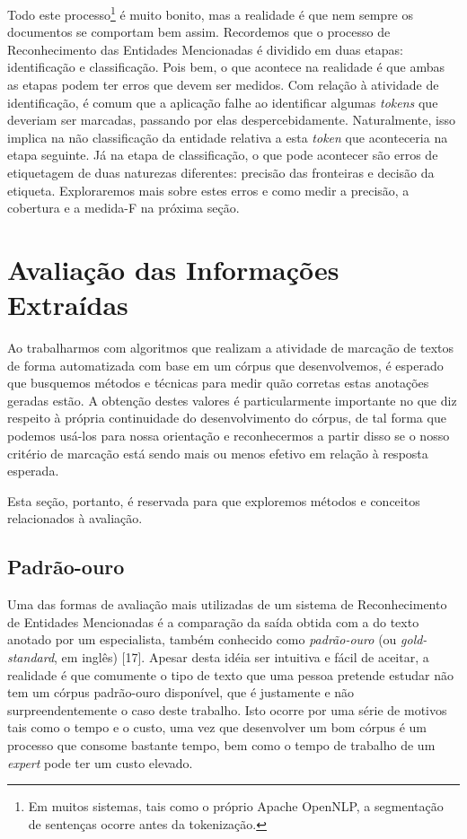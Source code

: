\documentclass[11pt]{report}
\begin{document}
Todo este processo\footnote[3]{Em muitos sistemas, tais como o próprio Apache OpenNLP, a segmentação de sentenças ocorre antes da tokenização.} é muito bonito, mas a realidade é que nem sempre
os documentos se comportam bem assim. Recordemos que o processo de Reconhecimento das Entidades Mencionadas
é dividido em duas etapas: identificação e classificação. Pois bem, o que acontece na realidade é que ambas as etapas podem ter erros que devem ser medidos. Com relação
à atividade de identificação, é comum que a aplicação falhe ao identificar algumas \textit{tokens} que deveriam ser marcadas, passando por elas despercebidamente. Naturalmente, isso
implica na não classificação da entidade relativa a esta \textit{token} que aconteceria na etapa seguinte. Já na etapa de classificação, o que pode acontecer são erros de etiquetagem
de duas naturezas diferentes: precisão das fronteiras e decisão da etiqueta. Exploraremos mais sobre estes erros e como medir a precisão, a cobertura e a medida-F na próxima seção.

\section{Avaliação das Informações Extraídas}

\indent\indent Ao trabalharmos com algoritmos que realizam a atividade de marcação de textos de forma automatizada com base em um córpus que desenvolvemos, é
esperado que busquemos métodos e técnicas para medir quão corretas estas anotações geradas estão. A obtenção destes valores é particularmente
importante no que diz respeito à própria continuidade do desenvolvimento do córpus, de tal forma que podemos usá-los para nossa orientação e
reconhecermos a partir disso se o nosso critério de marcação está sendo mais ou menos efetivo em relação à resposta esperada.

Esta seção, portanto,
é reservada para que exploremos métodos e conceitos relacionados à avaliação.

\subsection{Padrão-ouro}

\indent\indent Uma das formas de avaliação mais utilizadas de um sistema de Reconhecimento de Entidades Mencionadas é a comparação da saída obtida com a do texto anotado por
um especialista, também conhecido como \textit{padrão-ouro} (ou \textit{gold-standard}, em inglês) [17]. Apesar desta idéia ser intuitiva e fácil de aceitar, a realidade é que
comumente o tipo de texto que uma pessoa pretende estudar não tem um córpus padrão-ouro disponível, que é justamente e não surpreendentemente o caso deste trabalho. Isto ocorre
por uma série de motivos tais como o tempo e o custo, uma vez que desenvolver um bom córpus é um processo que consome bastante tempo, bem como o tempo de trabalho de um \textit{expert}
pode ter um custo elevado.
\end{document}
